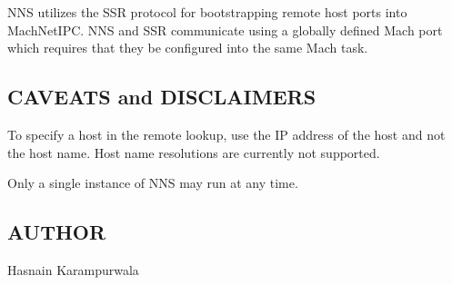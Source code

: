 NNS utilizes the SSR protocol for bootstrapping remote host ports into
MachNetIPC. NNS and SSR communicate using a globally defined Mach port which 
requires that they be configured into the same Mach task.

\subsection*{CAVEATS and DISCLAIMERS}

To specify a host in the remote lookup, use the IP address of the host
and not the host name. Host name resolutions are currently not supported.

Only a single instance of NNS may run at any time.

\subsection*{AUTHOR}

\noindent Hasnain Karampurwala

